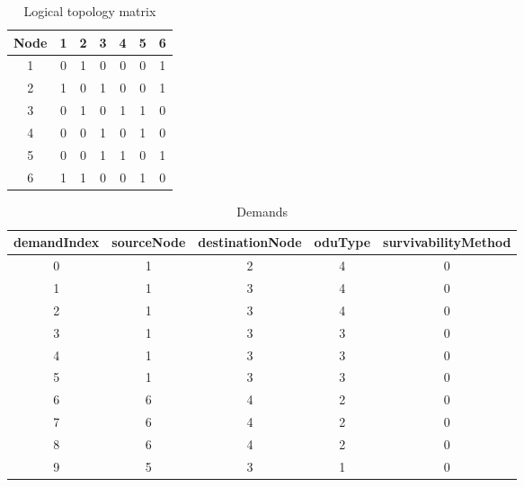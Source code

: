 \begin{table}[H]
	\centering
	\begin{tabular}{| c | c | c | c | c | c | c |}
		\hline
		\textbf{Node} & 1 & 2 & 3 & 4 & 5 & 6 \\ \hline
		1             & 0 & 1 & 0 & 0 & 0 & 1 \\ \hline
		2             & 1 & 0 & 1 & 0 & 0 & 1 \\ \hline
		3             & 0 & 1 & 0 & 1 & 1 & 0 \\ \hline
		4			  & 0 & 0 & 1 & 0 & 1 & 0 \\ \hline	
		5    	      & 0 & 0 & 1 & 1 & 0 & 1 \\ \hline
		6			  & 1 & 1 & 0 & 0 & 1 & 0 \\ \hline
	\end{tabular}
	\caption{Logical topology matrix}
	\label{logical_matrix}
\end{table}


\begin{table}[H]
	\centering
	\begin{tabular}{| c | c | c | c | c |}
		\hline
		\textbf{demandIndex} & \textbf{sourceNode} & \textbf{destinationNode} & \textbf{oduType} & \textbf{survivabilityMethod}\\ \hline
		0                    & 1                   & 2                        & 4                & 0						   \\ \hline
		1                    & 1                   & 3                        & 4                & 0                           \\ \hline
		2                    & 1                   & 3                        & 4                & 0                           \\ \hline
		3                    & 1                   & 3                        & 3                & 0                           \\ \hline
		4                    & 1                   & 3                        & 3                & 0                           \\ \hline
		5                    & 1                   & 3                        & 3                & 0                           \\ \hline
		6                    & 6                   & 4                        & 2                & 0                           \\ \hline
		7                    & 6                   & 4                        & 2                & 0                           \\ \hline
		8                    & 6                   & 4                        & 2                & 0                           \\ \hline
		9                    & 5                   & 3                        & 1                & 0                           \\ \hline
	\end{tabular}
	\caption{Demands}
	\label{demand_variable}
\end{table}


